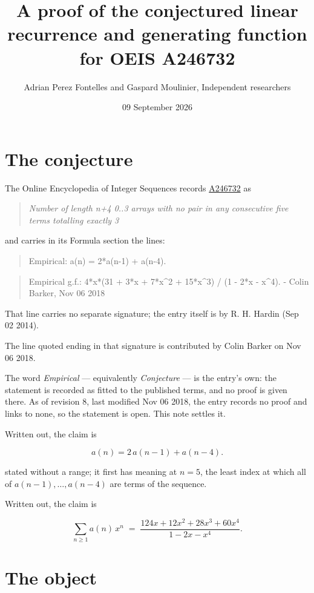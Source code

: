 \documentclass[11pt]{article}
\title{A proof of the conjectured linear recurrence and generating function for OEIS A246732}
\author{Adrian Perez Fontelles and Gaspard Moulinier, Independent researchers}
\date{09 September 2026}
\theoremstyle{definition}
\begin{document}
\maketitle
\section{The conjecture}

The Online Encyclopedia of Integer Sequences records \href{https://oeis.org/A246732}{A246732} as

\begin{quote}\itshape Number of length n+4 0..3 arrays with no pair in any consecutive five terms totalling exactly 3\end{quote}

and carries in its Formula section the lines:

\begin{quote}\ttfamily Empirical: a(n) = 2*a(n-1) + a(n-4).\end{quote}

\begin{quote}\ttfamily Empirical g.f.: 4*x*(31 + 3*x + 7*x\textasciicircum{}2 + 15*x\textasciicircum{}3) / (1 - 2*x - x\textasciicircum{}4). - Colin Barker, Nov 06 2018\end{quote}

That line carries no separate signature; the entry itself is by R. H. Hardin (Sep 02 2014).

The line quoted ending in that signature is contributed by Colin Barker on Nov 06 2018.

The word {\itshape Empirical} --- equivalently {\itshape Conjecture} --- is the entry's own: the statement is recorded as fitted to the published terms, and no proof is given there. As of revision 8, last modified Nov 06 2018, the entry records no proof and links to none, so the statement is open. This note settles it.

Written out, the claim is

\[a(n) = 2\,a(n-1) + a(n-4).\]

stated without a range; it first has meaning at $n = 5$, the least index at which all of $a(n-1),\dots,a(n-4)$ are terms of the sequence.

Written out, the claim is

\[\sum_{n \ge 1} a(n)\,x^n \;=\; \frac{124x + 12x^{2} + 28x^{3} + 60x^{4}}{1 - 2x - x^{4}}.\]

\section{The object}
\end{document}
